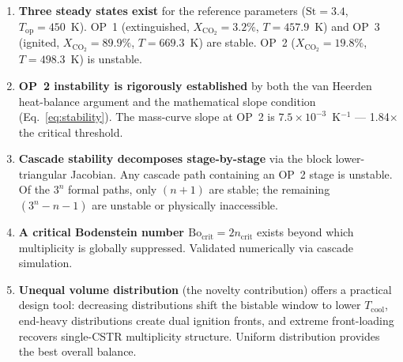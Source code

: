 \documentclass[11pt,a4paper]{article}
\newcommand{\Xco}{X_{\mathrm{CO_2}}}
\newcommand{\Tcool}{T_{\mathrm{cool}}}
\newcommand{\Top}{T_{\mathrm{op}}}
\newcommand{\St}{\mathrm{St}}
\newcommand{\Bo}{\mathrm{Bo}}
\begin{document}
\begin{enumerate}[leftmargin=1.6em,itemsep=3pt]
  \item \textbf{Three steady states exist} for the reference parameters
        ($\St=3.4$, $\Top=450$~K).  OP~1 (extinguished, $\Xco=3.2\%$,
        $T=457.9$~K) and OP~3 (ignited, $\Xco=89.9\%$, $T=669.3$~K) are
        stable.  OP~2 ($\Xco=19.8\%$, $T=498.3$~K) is unstable.

  \item \textbf{OP~2 instability is rigorously established} by both the
        van Heerden heat-balance argument and the mathematical slope condition
        (Eq.~\eqref{eq:stability}).  The mass-curve slope at OP~2 is
        $7.5\times10^{-3}$~K$^{-1}$ — 1.84$\times$ the critical threshold.

  \item \textbf{Cascade stability decomposes stage-by-stage} via the
        block lower-triangular Jacobian.  Any cascade path containing an
        OP~2 stage is unstable.  Of the $3^n$ formal paths, only $(n+1)$
        are stable; the remaining $(3^n-n-1)$ are unstable or physically
        inaccessible.

  \item \textbf{A critical Bodenstein number $\Bo_\mathrm{crit}=2n_\mathrm{crit}$}
        exists beyond which multiplicity is globally suppressed.  Validated
        numerically via cascade simulation.

  \item \textbf{Unequal volume distribution} (the novelty contribution)
        offers a practical design tool: decreasing distributions shift the
        bistable window to lower $\Tcool$, end-heavy distributions create
        dual ignition fronts, and extreme front-loading recovers single-CSTR
        multiplicity structure.  Uniform distribution provides the best
        overall balance.
\end{enumerate}
\end{document}
